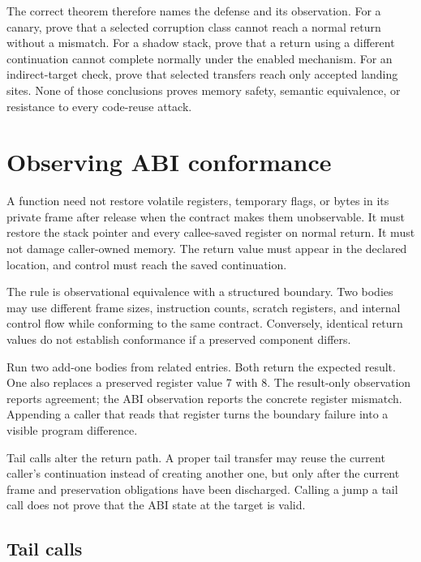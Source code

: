 The correct theorem therefore names the defense and its observation. For a
canary, prove that a selected corruption class cannot reach a normal return
without a mismatch. For a shadow stack, prove that a return using a different
continuation cannot complete normally under the enabled mechanism. For an
indirect-target check, prove that selected transfers reach only accepted
landing sites. None of those conclusions proves memory safety, semantic
equivalence, or resistance to every code-reuse attack.

\section{Observing ABI conformance}

A function need not restore volatile registers, temporary flags, or bytes in
its private frame after release when the contract makes them unobservable. It
must restore the stack pointer and every callee-saved register on normal
return. It must not damage caller-owned memory. The return value must appear in
the declared location, and control must reach the saved continuation.

The rule is observational equivalence with a structured boundary. Two bodies may
use different frame sizes, instruction counts, scratch registers, and internal
control flow while conforming to the same contract. Conversely, identical
return values do not establish conformance if a preserved component differs.

\begin{example}[title={The smallest useful ABI counterexample}]
Run two add-one bodies from related entries. Both return the expected result.
One also replaces a preserved register value 7 with 8. The result-only
observation reports agreement; the ABI observation reports the concrete
register mismatch. Appending a caller that reads that register turns the
boundary failure into a visible program difference.
\end{example}

Tail calls alter the return path. A proper tail transfer may reuse the current
caller's continuation instead of creating another one, but only after the
current frame and preservation obligations have been discharged. Calling a
jump a tail call does not prove that the ABI state at the target is valid.

\subsection{Tail calls}

